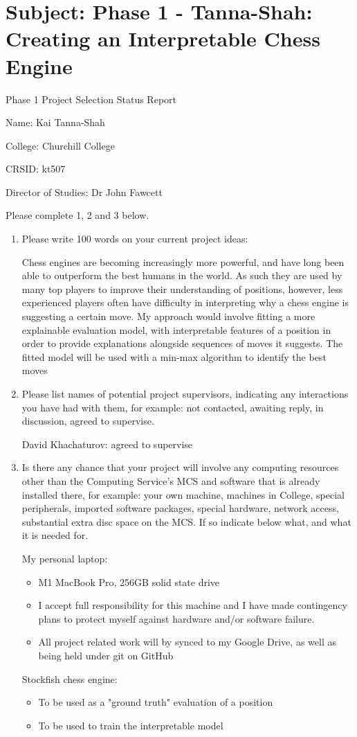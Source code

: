 \documentclass[10pt,a4paper]{article}
\begin{document}
\section*{Subject: Phase 1 - Tanna-Shah: Creating an \mbox{Interpretable} Chess Engine}

Phase 1 Project Selection Status Report
\vspace{5pt}

Name: Kai Tanna-Shah

College: Churchill College

CRSID: kt507

Director of Studies: Dr John Fawcett

Please complete 1, 2 and 3 below.
\begin{enumerate}
\item Please write 100 words on your current project ideas:

Chess engines are becoming increasingly more powerful, and have long been able to outperform the best humans in the world. As such they are used by many top players to improve their understanding of positions, however, less experienced players often have difficulty in interpreting why a chess engine is suggesting a certain move. My approach would involve fitting a more explainable evaluation model, with interpretable features of a position in order to provide explanations alongside sequences of moves it suggests. The fitted model will be used with a min-max algorithm to identify the best moves

\item Please list names of potential project supervisors, indicating
any interactions you have had with them, for example: not
contacted, awaiting reply, in discussion, agreed to supervise.

David Khachaturov: agreed to supervise


\item Is there any chance that your project will involve any
computing resources other than the Computing Service's MCS and
software that is already installed there, for example: your own
machine, machines in College, special peripherals, imported
software packages, special hardware, network access, substantial
extra disc space on the MCS. 
If so indicate below what, and what it is needed for.

My personal laptop:
\begin{itemize}
    \item M1 MacBook Pro, 256GB solid state drive
    \item I accept full responsibility for this machine and I have made contingency plans to protect myself against hardware and/or software failure.
    \item All project related work will by synced to my Google Drive, as well as being held under git on GitHub
\end{itemize}

Stockfish chess engine:
\begin{itemize}
    \item To be used as a "ground truth" evaluation of a position
    \item To be used to train the interpretable model
\end{itemize}
\end{enumerate}
\end{document}
